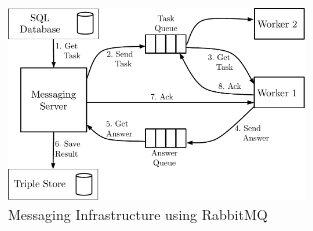 \begin{figure}[ht]
  \begin{center}
  \includegraphics[width=0.7\textwidth]{images/rabbit_mq.pdf}
  \end{center}
  \caption{Messaging Infrastructure using RabbitMQ}
  \label{fig_messaging_infrastructure}
\end{figure}